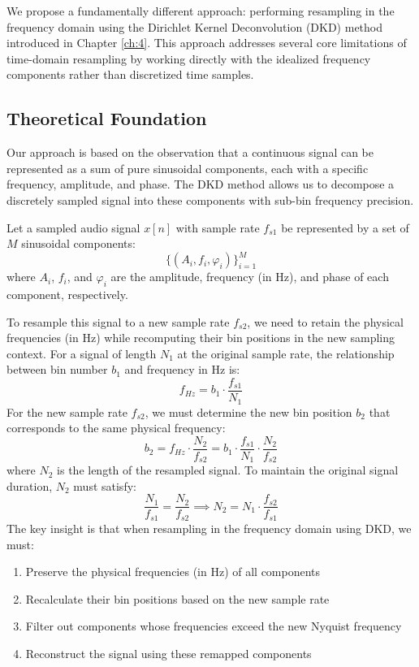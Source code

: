 \documentclass[11pt,twoside]{report}
\numberwithin{thm}{section}
\numberwithin{equation}{section}
\begin{document}
We propose a fundamentally different approach: performing resampling in the frequency domain using the Dirichlet Kernel Deconvolution (DKD) method introduced in Chapter \ref{ch:4}. This approach addresses several core limitations of time-domain resampling by working directly with the idealized frequency components rather than discretized time samples.

\subsection{Theoretical Foundation}

Our approach is based on the observation that a continuous signal can be represented as a sum of pure sinusoidal components, each with a specific frequency, amplitude, and phase. The DKD method allows us to decompose a discretely sampled signal into these components with sub-bin frequency precision. 

Let a sampled audio signal $x[n]$ with sample rate $f_{s1}$ be represented by a set of $M$ sinusoidal components:
\begin{equation}
\{(A_i, f_i, \varphi_i)\}_{i=1}^M
\end{equation}
where $A_i$, $f_i$, and $\varphi_i$ are the amplitude, frequency (in Hz), and phase of each component, respectively.

To resample this signal to a new sample rate $f_{s2}$, we need to retain the physical frequencies (in Hz) while recomputing their bin positions in the new sampling context. For a signal of length $N_1$ at the original sample rate, the relationship between bin number $b_1$ and frequency in Hz is:
\begin{equation}
f_{Hz} = b_1 \cdot \frac{f_{s1}}{N_1}
\end{equation}
For the new sample rate $f_{s2}$, we must determine the new bin position $b_2$ that corresponds to the same physical frequency:
\begin{equation}
b_2 = f_{Hz} \cdot \frac{N_2}{f_{s2}} = b_1 \cdot \frac{f_{s1}}{N_1} \cdot \frac{N_2}{f_{s2}}
\end{equation}
where $N_2$ is the length of the resampled signal. To maintain the original signal duration, $N_2$ must satisfy:
\begin{equation}
\frac{N_1}{f_{s1}} = \frac{N_2}{f_{s2}} \implies N_2 = N_1 \cdot \frac{f_{s2}}{f_{s1}}
\end{equation}
The key insight is that when resampling in the frequency domain using DKD, we must:
\begin{enumerate}
    \item Preserve the physical frequencies (in Hz) of all components
    \item Recalculate their bin positions based on the new sample rate
    \item Filter out components whose frequencies exceed the new Nyquist frequency
    \item Reconstruct the signal using these remapped components
\end{enumerate}
\end{document}
